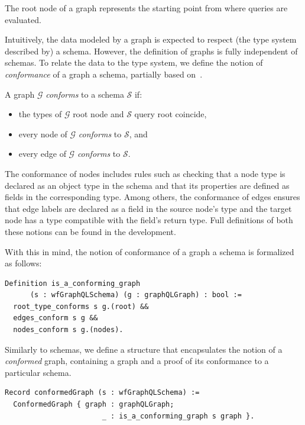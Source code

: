 The root node of a \gql graph represents the starting point from where queries are evaluated.

Intuitively, the data modeled by a \gql graph is expected to respect
(the type system described by) a schema. However, the definition of
graphs is fully independent of schemas. To relate the data to the type system, we define the notion of \textit{conformance} of a graph \wrt a schema, partially based on~\cite{gqlph}.
%
\begin{definition}
A \gql graph $\mathcal{G}$ \textit{conforms} to a schema $\mathcal{S}$ if:
\begin{itemize}
    \item the types of $\mathcal{G}$ root node and $\mathcal{S}$ query
      root coincide,
    \item every node of $\mathcal{G}$ \textit{conforms} to
      $\mathcal{S}$, and
    \item every edge of $\mathcal{G}$ \textit{conforms} to
      $\mathcal{S}$. 
   
\end{itemize}
\end{definition}
%


The conformance of nodes includes rules such as checking that a node
type is declared as an object type in the schema and that its
properties are defined as fields in the corresponding type. Among
others, the conformance of edges ensures that edge labels are declared
as a field in the source node's type and the target node has a type
compatible with the field's return type. Full definitions of both
these notions can be found in the \coq development. %

With this in mind, the notion of conformance of a graph \wrt a schema is formalized as follows:
%
\begin{verbatim}
Definition is_a_conforming_graph 
      (s : wfGraphQLSchema) (g : graphQLGraph) : bool :=
  root_type_conforms s g.(root) &&
  edges_conform s g &&
  nodes_conform s g.(nodes).
\end{verbatim}
%

Similarly to \gql schemas, we define a structure that encapsulates the notion of a \textit{conformed} graph, containing a graph and a proof of its conformance to a particular schema.

\begin{verbatim}
Record conformedGraph (s : wfGraphQLSchema) :=
  ConformedGraph { graph : graphQLGraph;
                       _ : is_a_conforming_graph s graph }.
\end{verbatim}

